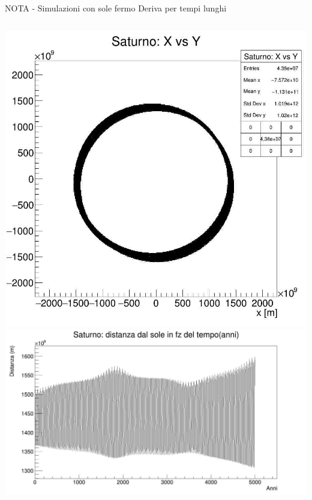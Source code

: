         \begin{frame}{NOTA - Simulazioni con sole fermo}
            Deriva per tempi lunghi
            \vspace{1cm}
            \begin{columns}
                    \centering
                    \includegraphics[width=\textwidth]{14_fisso/sf_5k_sat_orb.jpg}  
                    \centering
                    \includegraphics[width=\textwidth]{14_fisso/sf_5k_sat_drift.jpg}   
            \end{columns}
        \end{frame}